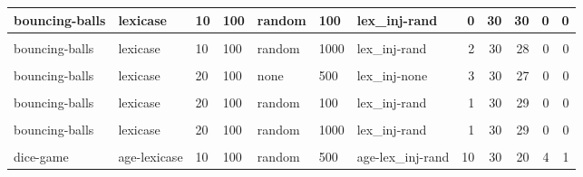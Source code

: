 \documentclass[
]{book}
\begin{document}
\begin{table}
\begin{tabular}{l|l|l|l|l|l|l|r|r|r|r|r}
\hline
bouncing-balls & lexicase & 10 & 100 & random & 100 & lex\_inj-rand & 0 & 30 & 30 & 0 & 0\\
\hline
\cellcolor{gray!6}{bouncing-balls} & \cellcolor{gray!6}{lexicase} & \cellcolor{gray!6}{10} & \cellcolor{gray!6}{100} & \cellcolor{gray!6}{random} & \cellcolor{gray!6}{500} & \cellcolor{gray!6}{lex\_inj-rand} & \cellcolor{gray!6}{1} & \cellcolor{gray!6}{30} & \cellcolor{gray!6}{29} & \cellcolor{gray!6}{0} & \cellcolor{gray!6}{0}\\
\hline
bouncing-balls & lexicase & 10 & 100 & random & 1000 & lex\_inj-rand & 2 & 30 & 28 & 0 & 0\\
\hline
\cellcolor{gray!6}{bouncing-balls} & \cellcolor{gray!6}{lexicase} & \cellcolor{gray!6}{20} & \cellcolor{gray!6}{100} & \cellcolor{gray!6}{none} & \cellcolor{gray!6}{100} & \cellcolor{gray!6}{lex\_inj-none} & \cellcolor{gray!6}{1} & \cellcolor{gray!6}{30} & \cellcolor{gray!6}{29} & \cellcolor{gray!6}{0} & \cellcolor{gray!6}{0}\\
\hline
bouncing-balls & lexicase & 20 & 100 & none & 500 & lex\_inj-none & 3 & 30 & 27 & 0 & 0\\
\hline
\cellcolor{gray!6}{bouncing-balls} & \cellcolor{gray!6}{lexicase} & \cellcolor{gray!6}{20} & \cellcolor{gray!6}{100} & \cellcolor{gray!6}{none} & \cellcolor{gray!6}{1000} & \cellcolor{gray!6}{lex\_inj-none} & \cellcolor{gray!6}{0} & \cellcolor{gray!6}{30} & \cellcolor{gray!6}{30} & \cellcolor{gray!6}{0} & \cellcolor{gray!6}{0}\\
\hline
bouncing-balls & lexicase & 20 & 100 & random & 100 & lex\_inj-rand & 1 & 30 & 29 & 0 & 0\\
\hline
\cellcolor{gray!6}{bouncing-balls} & \cellcolor{gray!6}{lexicase} & \cellcolor{gray!6}{20} & \cellcolor{gray!6}{100} & \cellcolor{gray!6}{random} & \cellcolor{gray!6}{500} & \cellcolor{gray!6}{lex\_inj-rand} & \cellcolor{gray!6}{0} & \cellcolor{gray!6}{30} & \cellcolor{gray!6}{30} & \cellcolor{gray!6}{0} & \cellcolor{gray!6}{0}\\
\hline
bouncing-balls & lexicase & 20 & 100 & random & 1000 & lex\_inj-rand & 1 & 30 & 29 & 0 & 0\\
\hline
\cellcolor{gray!6}{dice-game} & \cellcolor{gray!6}{age-lexicase} & \cellcolor{gray!6}{10} & \cellcolor{gray!6}{100} & \cellcolor{gray!6}{random} & \cellcolor{gray!6}{100} & \cellcolor{gray!6}{age-lex\_inj-rand} & \cellcolor{gray!6}{20} & \cellcolor{gray!6}{30} & \cellcolor{gray!6}{10} & \cellcolor{gray!6}{0} & \cellcolor{gray!6}{0}\\
\hline
dice-game & age-lexicase & 10 & 100 & random & 500 & age-lex\_inj-rand & 10 & 30 & 20 & 4 & 1\\

\end{tabular}
\end{table}
\end{document}
